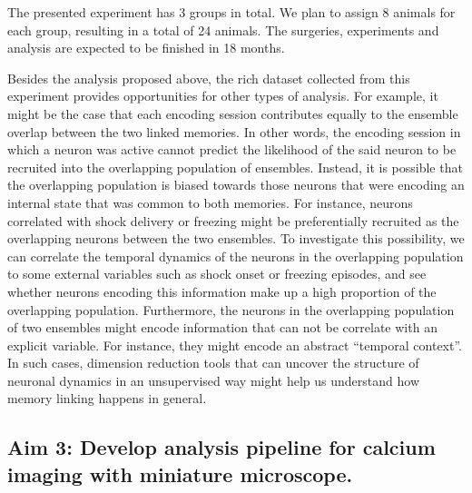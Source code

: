 \documentclass[master.tex]{subfiles}
\begin{document}
The presented experiment has 3 groups in total. We plan to assign 8 animals for
each group, resulting in a total of 24 animals. The surgeries, experiments and
analysis are expected to be finished in 18 months.

Besides the analysis proposed above, the rich dataset collected from this
experiment provides opportunities for other types of analysis. For example, it
might be the case that each encoding session contributes equally to the ensemble
overlap between the two linked memories. In other words, the encoding session in
which a neuron was active cannot predict the likelihood of the said neuron to be
recruited into the overlapping population of ensembles. Instead, it is possible
that the overlapping population is biased towards those neurons that were
encoding an internal state that was common to both memories. For instance,
neurons correlated with shock delivery or freezing might be preferentially
recruited as the overlapping neurons between the two ensembles. To investigate
this possibility, we can correlate the temporal dynamics of the neurons in the
overlapping population to some external variables such as shock onset or
freezing episodes, and see whether neurons encoding this information make up a
high proportion of the overlapping population. Furthermore, the neurons in the
overlapping population of two ensembles might encode information that can not be
correlate with an explicit variable. For instance, they might encode an abstract
``temporal context''. In such cases, dimension reduction tools that can uncover
the structure of neuronal dynamics in an unsupervised way might help us
understand how memory linking happens in general.

\subsection*{Aim 3: Develop analysis pipeline for calcium imaging with miniature
  microscope.}
\end{document}
